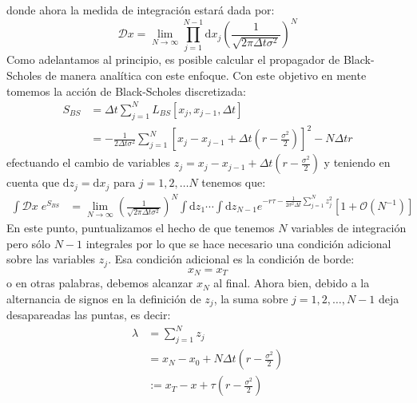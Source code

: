 \documentclass[11pt,a4paper]{article}
\begin{document}
donde ahora la medida de integraci\'on estar\'a dada por:
\begin{equation}
\mathcal{D}x = \lim_{N \rightarrow \infty} \prod_{j=1}^{N-1}\mathrm{d}x_j\left(\frac{1}{\sqrt{2\pi\Delta t\sigma^2}}\right)^N
\label{eq:measureconfigurationblackscholes}
\end{equation}
Como adelantamos al principio, es posible calcular el propagador de Black-Scholes de manera anal\'itica con este enfoque. Con este objetivo en mente tomemos la acci\'on de Black-Scholes discretizada:
\begin{equation}
\begin{split}
S_{BS} & = \Delta t \sum_{j=1}^N L_{BS} [x_j, x_{j-1},\Delta t] \\
       & = -\frac{1}{2\Delta t\sigma^2}\sum_{j=1}^N \left[ x_j - x_{j-1} + \Delta t\left( r - \frac{\sigma^2}{2} \right) \right]^2 - N\Delta t r
\end{split}
\label{eq:blackscholesaction}
\end{equation}
efectuando el cambio de variables $z_j = x_j - x_{j-1} + \Delta t\left( r - \frac{\sigma^2}{2} \right)$ y teniendo en cuenta que $\mathrm{d}z_j = \mathrm{d}x_j$ para $j = 1,2,\dots N$ tenemos que:
\begin{equation}
\begin{split}
\int\mathcal{D}x \; e^{S_{BS}} & = \lim_{N\rightarrow \infty}\left(\frac{1}{\sqrt{2\pi\Delta t\sigma^2}}\right)^N \int \mathrm{d}z_1 \cdots \int \mathrm{d}z_{N-1} e^{-r\tau - \frac{1}{2\sigma^2\Delta t}\sum_{j=1}^Nz_j^2} \left[ 1 + \mathcal{O} \left( N^{-1} \right) \right]
\end{split}
\label{eq:blackscholespropagator8}
\end{equation}
En este punto, puntualizamos el hecho de que tenemos $N$ variables de integraci\'on pero s\'olo $N-1$ integrales por lo que se hace necesario una condici\'on adicional sobre las variables $z_j$. Esa condici\'on adicional es la condici\'on de borde:
\begin{equation}
x_N = x_T
\label{eq:boundarycondition1}
\end{equation}
o en otras palabras, debemos alcanzar $x_N$ al final. Ahora bien, debido a la alternancia de signos en la definici\'on de $z_j$, la suma sobre $j = 1,2, \dots, N-1$ deja desapareadas las puntas, es decir:
\begin{equation}
\begin{split}
\lambda & = \sum_{j = 1}^N z_j \\
        & = x_N - x_0 + N \Delta t \left( r - \frac{\sigma^2}{2}\right) \\
        & := x_T - x + \tau\left( r - \frac{\sigma^2}{2}\right)
\end{split}
\label{eq:boundarycondition2}
\end{equation}
\end{document}
